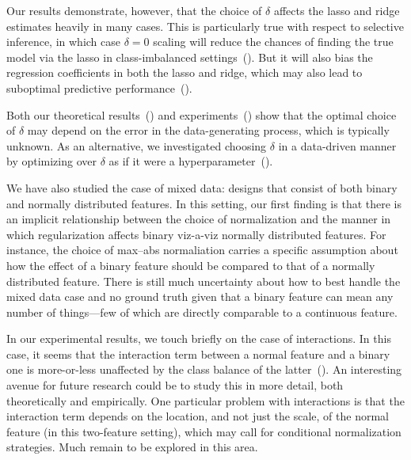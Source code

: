Our results demonstrate, however, that the choice of \(\delta\) affects the lasso and ridge
estimates heavily in many cases. This is particularly true with respect to selective
inference, in which case \(\delta=0\) scaling will reduce the chances of finding the true
model via the lasso in class-imbalanced settings~(). But it
will also bias the regression coefficients in both the lasso and ridge, which may also lead
to suboptimal predictive performance~().

Both our theoretical results~() and
experiments~() show that the optimal choice of \(\delta\) may
depend on the error in the data-generating process, which is typically unknown. As an
alternative, we investigated choosing \(\delta\) in a data-driven manner by optimizing over
\(\delta\) as if it were a hyperparameter~().

We have also studied the case of mixed data: designs that consist of both binary and
normally distributed features. In this setting, our first finding is that there is an
implicit relationship between the choice of normalization and the manner in which
regularization affects binary viz-a-viz normally distributed features. For instance, the
choice of max--abs normaliation carries a specific assumption about how the effect of a
binary feature should be compared to that of a normally distributed feature. There is still
much uncertainty about how to best handle the mixed data case and no ground truth given
that a binary feature can mean any number of things---few of which are directly comparable
to a continuous feature.

In our experimental results, we touch briefly on the case of interactions. In this case, it
seems that the interaction term between a normal feature and a binary one is more-or-less
unaffected by the class balance of the latter~(). An
interesting avenue for future research could be to study this in more detail, both
theoretically and empirically. One particular problem with interactions is that the
interaction term depends on the location, and not just the scale, of the normal feature (in
this two-feature setting), which may call for conditional normalization strategies. Much
remain to be explored in this area.

